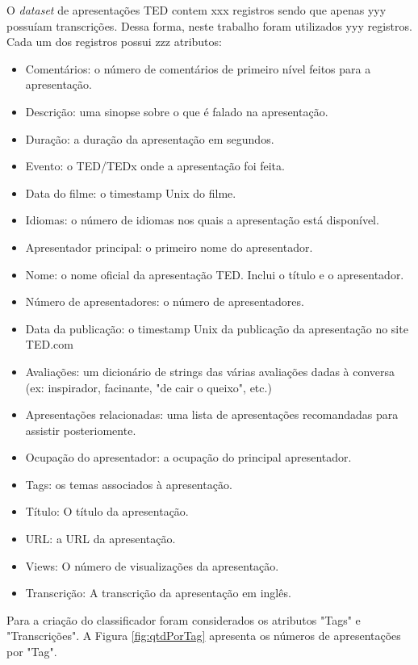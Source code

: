 \documentclass{article}
\begin{document}
O \textit{dataset} de apresentações TED contem xxx registros sendo que apenas yyy possuíam transcrições. Dessa forma, neste trabalho foram utilizados yyy registros.\\

Cada um dos registros possui zzz atributos: 

\begin{itemize}
\item Comentários: o número de comentários de primeiro nível feitos para a apresentação.	
\item Descrição: uma sinopse sobre o que é falado na apresentação.
\item Duração: a duração da apresentação em segundos.
\item Evento: o TED/TEDx onde a apresentação foi feita.
\item Data do filme: o timestamp Unix do filme.
\item Idiomas: o número de idiomas nos quais a apresentação está disponível.
\item Apresentador principal: o primeiro nome do apresentador.
\item Nome: o nome oficial da apresentação TED. Inclui o título e o apresentador.
\item Número de apresentadores: o número de apresentadores.
\item Data da publicação: o timestamp Unix da publicação da apresentação no site TED.com
\item Avaliações: um dicionário de strings das várias avaliações dadas à conversa (ex: inspirador, facinante, "de cair o queixo", etc.)
\item Apresentações relacionadas: uma lista de apresentações recomandadas para assistir posteriomente.
\item Ocupação do apresentador: a ocupação do principal apresentador.
\item Tags: os temas associados à apresentação.
\item Título: O título da apresentação.
\item URL: a URL da apresentação.
\item Views: O número de visualizações da apresentação.
\item Transcrição: A transcrição da apresentação em inglês.
\end{itemize}

Para a criação do classificador foram considerados os atributos "Tags" e "Transcrições". A Figura \ref{fig:qtdPorTag} apresenta os números de apresentações por "Tag".
\end{document}
